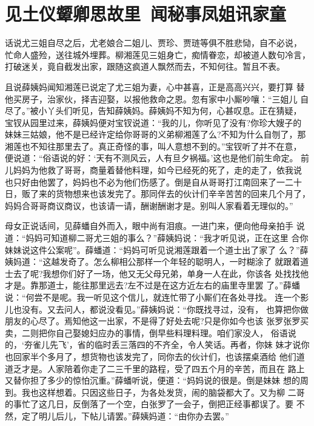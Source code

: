 \chapter{见土仪颦卿思故里~闻秘事凤姐讯家童}

话说尤三姐自尽之后，尤老娘合二姐儿、贾珍、贾琏等俱不胜悲恸，自不必说，
忙命人盛殓，送往城外埋葬。柳湘莲见三姐身亡，痴情眷恋，却被道人数句冷言，
打破迷关，竟自截发出家，跟随这疯道人飘然而去，不知何往。暂且不表。

且说薛姨妈闻知湘莲已说定了尤三姐为妻，心中甚喜，正是高高兴兴，要打算
替他买房子，治家伙，择吉迎娶，以报他救命之恩。忽有家中小厮吵嚷：“三姐儿
自尽了。”被小丫头们听见，告知薛姨妈。薛姨妈不知为何，心甚叹息。正在猜疑，
宝钗从园里过来，薛姨妈便对宝钗说道：“我的儿，你听见了没有?你珍大嫂子的
妹妹三姑娘，他不是已经许定给你哥哥的义弟柳湘莲了么?不知为什么自刎了，那
湘莲也不知往那里去了。真正奇怪的事，叫人意想不到的。”宝钗听了并不在意，
便说道：“俗语说的好：‘天有不测风云，人有旦夕祸福。’这也是他们前生命定。
前儿妈妈为他救了哥哥，商量着替他料理，如今已经死的死了，走的走了，依我说
也只好由他罢了，妈妈也不必为他们伤感了。倒是自从哥哥打江南回来了一二十
日，贩了来的货物想来也该发完了。那同伴去的伙计们辛辛苦苦的回来几个月了，
妈妈合哥哥商议商议，也该请一请，酬谢酬谢才是。别叫人家看着无理似的。”

母女正说话间，见薛蟠自外而入，眼中尚有泪痕。一进门来，便向他母亲拍手
说道：“妈妈可知道柳二哥尤三姐的事么？”薛姨妈说：“我才听见说，正在这里
合你妹妹说这件公案呢”。薛蟠道：“妈妈可听见说湘莲跟着一个道士出了家了
么？”薛姨妈道：“这越发奇了。怎么柳相公那样一个年轻的聪明人，一时糊涂了
就跟着道士去了呢?我想你们好了一场，他又无父母兄弟，单身一人在此，你该各
处找找他才是。靠那道士，能往那里远去?左不过是在这方近左右的庙里寺里罢
了。”薛蟠说：“何尝不是呢。我一听见这个信儿，就连忙带了小厮们在各处寻找。
连一个影儿也没有。又去问人，都说没看见。”薛姨妈说：“你既找寻过，没有，
也算把你做朋友的心尽了。焉知他这一出家，不是得了好处去呢?只是你如今也该
张罗张罗买卖，二则把你自己娶媳妇应办的事情，倒早些料理料理。咱们家没人，
俗语说的，‘夯雀儿先飞’，省的临时丢三落四的不齐全，令人笑话。再者，你妹
妹才说你也回家半个多月了，想货物也该发完了，同你去的伙计们，也该摆桌酒给
他们道道乏才是。人家陪着你走了二三千里的路程，受了四五个月的辛苦，而且在
路上又替你担了多少的惊怕沉重。”薛蟠听说，便道：“妈妈说的很是。倒是妹妹
想的周到。我也这样想着。只因这些日子，为各处发货，闹的脑袋都大了。又为柳
二哥的事忙了这几日，反倒落了一个空，白张罗了一会子，倒把正经事都误了。要
不然，定了明儿后儿，下帖儿请罢。”薛姨妈道：“由你办去罢。”


